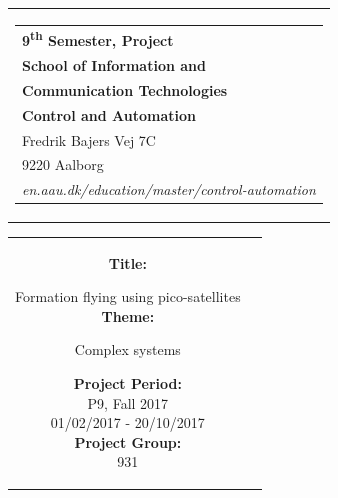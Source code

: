 % 
\begin{nopagebreak}
{\samepage 

\begin{tabular}{r}
\parbox{\textwidth}{  
\hfill \hspace{2cm} \parbox{8cm}{\begin{tabular}{l} %
{\small \textbf{\textcolor{aaublue}{\colorbox{white}{9\textsuperscript{th} Semester, Project}}}}\\
{\small \textbf{\textcolor{aaublue}{School of Information and}}}\\
{\small \textbf{\textcolor{aaublue}{Communication Technologies}}}\\ 
{\small \textbf{\textcolor{aaublue}{Control and Automation}}}\\
{\small \textcolor{aaublue}{Fredrik Bajers Vej 7C}} \\
{\small \textcolor{aaublue}{9220 Aalborg}} \\
{\small \textcolor{aaublue}{\emph{en.aau.dk/education/master/control-automation}}}
\end{tabular}}}
\end{tabular}

\begin{tabular}{cc}
\parbox{7cm}{

\textbf{Title:}

Formation flying using pico-satellites\\ %

\textbf{Theme:}

\small{
 Complex systems\\
}


\parbox{8cm}{


\textbf{Project Period:}\\
P9, Fall 2017\\
01/02/2017 - 20/10/2017\\
   
\textbf{Project Group:}\\
931\\ %
  
}}
\end{tabular}}
\end{nopagebreak}
